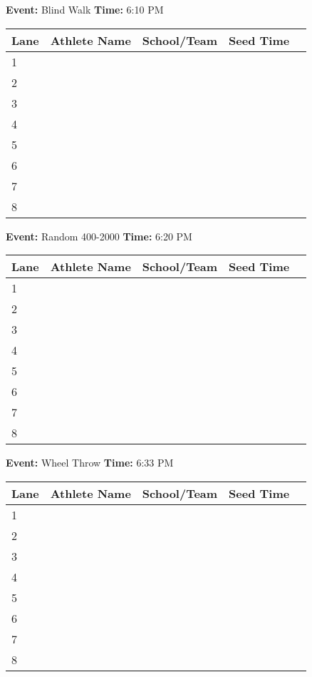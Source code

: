 \documentclass[11pt]{article}
\begin{document}
\textbf{Event:} Blind Walk \quad \textbf{Time:} 6:10 PM 

\vspace{1em}
\begin{tabular}{@{}lllll@{}}
\toprule
\textbf{Lane} & \textbf{Athlete Name} & \textbf{School/Team} & \textbf{Seed Time} \\
\midrule
1 & & & \\
2 & & & \\
3 & & & \\
4 & & & \\
5 & & & \\
6 & & & \\
7 & & & \\
8 & & & \\
\bottomrule
\end{tabular}
\vspace{2.5em}


\textbf{Event:} Random 400-2000 \quad \textbf{Time:} 6:20 PM 

\vspace{1em}
\begin{tabular}{@{}lllll@{}}
\toprule
\textbf{Lane} & \textbf{Athlete Name} & \textbf{School/Team} & \textbf{Seed Time} \\
\midrule
1 & & & \\
2 & & & \\
3 & & & \\
4 & & & \\
5 & & & \\
6 & & & \\
7 & & & \\
8 & & & \\
\bottomrule
\end{tabular}
\vspace{2.5em}


\textbf{Event:} Wheel Throw \quad \textbf{Time:} 6:33 PM 

\vspace{1em}
\begin{tabular}{@{}lllll@{}}
\toprule
\textbf{Lane} & \textbf{Athlete Name} & \textbf{School/Team} & \textbf{Seed Time} \\
\midrule
1 & & & \\
2 & & & \\
3 & & & \\
4 & & & \\
5 & & & \\
6 & & & \\
7 & & & \\
8 & & & \\
\bottomrule
\end{tabular}
\vspace{2.5em}
\end{document}
